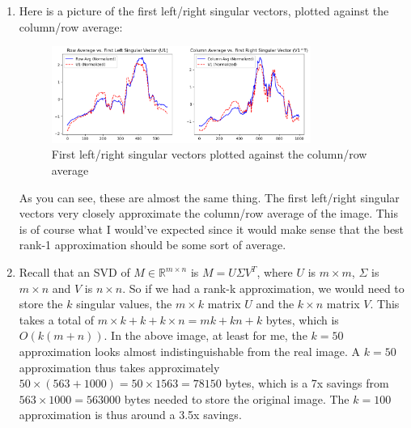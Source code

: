\documentclass[12pt]{article}
\theoremstyle{definitionstyle}
\def\mbb#1{\mathbb{#1}}
\def \R{\mbb{R}}
\begin{document}
\begin{enumerate}[leftmargin=\labelsep]
\begin{enumerate}[label=\textbf{(\alph*)}]
            \item Here is a picture of the first left/right singular vectors, plotted against the column/row average:
            \begin{figure}[H]
                \centering
                \includegraphics[width=0.8\textwidth]{left_and_right_sing.png}
                \caption{First left/right singular vectors plotted against the column/row average}
            \end{figure}
            As you can see, these are almost the same thing. The first left/right singular vectors very closely approximate the column/row average of the image. This is of course what I would've expected since it would make sense that the best rank-1 approximation should be some sort of average.
    
            \item Recall that an SVD of $M \in \R^{m \times n}$ is $M = U \Sigma V^T$, where $U$ is $m \times m$, $\Sigma$ is $m \times n$ and $V$ is $n \times n$. So if we had a rank-k approximation, we would need to store the $k$ singular values, the $m \times k$ matrix $U$ and the $k \times n$ matrix $V$. This takes a total of $m \times k + k + k \times n = mk + kn + k$ bytes, which is $O(k(m+n))$. In the above image, at least for me, the $k=50$ approximation looks almost indistinguishable from the real image. A $k=50$ approximation thus takes approximately $50 \times (563 + 1000) = 50 \times 1563 = 78150$ bytes, which is a 7x savings from $563 \times 1000 = 563000$ bytes needed to store the original image. The $k=100$ approximation is thus around a 3.5x savings.
    

\end{enumerate}
\end{enumerate}
\end{document}
